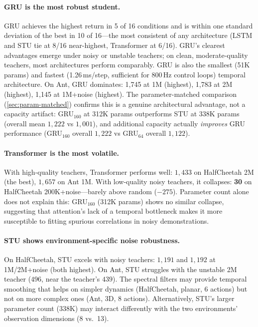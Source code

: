 \paragraph{GRU is the most robust student.}
GRU achieves the highest return in 5 of 16 conditions and is within one standard deviation of the best in 10 of 16---the most consistent of any architecture (LSTM and STU tie at 8/16 near-highest, Transformer at 6/16). GRU's clearest advantages emerge under noisy or unstable teachers; on clean, moderate-quality teachers, most architectures perform comparably. GRU is also the smallest (51K params) and fastest (1.26\,ms/step, sufficient for 800\,Hz control loops) temporal architecture.
On Ant, GRU dominates: 1{,}745 at 1M (highest), 1{,}783 at 2M (highest), 1{,}145 at 1M+noise (highest).
The parameter-matched comparison (\cref{sec:param-matched}) confirms this is a genuine architectural advantage, not a capacity artifact: GRU$_{160}$ at 312K params outperforms STU at 338K params (overall mean $1{,}222$ vs $1{,}001$), and additional capacity actually \emph{improves} GRU performance (GRU$_{160}$ overall $1{,}222$ vs GRU$_{64}$ overall $1{,}122$).

\paragraph{Transformer is the most volatile.}
With high-quality teachers, Transformer performs well: $1{,}433$ on HalfCheetah 2M (the best), $1{,}657$ on Ant 1M.
With low-quality noisy teachers, it collapses: \textbf{30} on HalfCheetah 200K+noise---barely above random ($-275$).
Parameter count alone does not explain this: GRU$_{160}$ (312K params) shows no similar collapse, suggesting that attention's lack of a temporal bottleneck makes it more susceptible to fitting spurious correlations in noisy demonstrations.

\paragraph{STU shows environment-specific noise robustness.}
On HalfCheetah, STU excels with noisy teachers: $1{,}191$ and $1{,}192$ at 1M/2M+noise (both highest).
On Ant, STU struggles with the unstable 2M teacher ($496$, near the teacher's $439$).
The spectral filters may provide temporal smoothing that helps on simpler dynamics (HalfCheetah, planar, 6 actions) but not on more complex ones (Ant, 3D, 8 actions).
Alternatively, STU's larger parameter count (338K) may interact differently with the two environments' observation dimensions (8 vs.\ 13).

